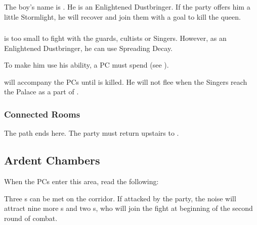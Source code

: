 
The boy's name is \npcCellarBoy{}. He is an Enlightened Dustbringer. If the party offers him a little Stormlight, he will recover and join them with a goal to kill the queen.

\subsubsection{\npcCellarBoyName{}}

\npcCellarBoy{} is too small to fight with the guards, cultists or Singers. However, as an Enlightened Dustbringer, he can use Spreading Decay.

To make him use his ability, a PC must spend \iconOpp{} (see ).

\npcCellarBoy{} will accompany the PCs until \npcQueen{} is killed. He will not flee when the Singers reach the Palace as a part of .

\subsubsection{Connected Rooms}

The path ends here. The party must return upstairs to .




\subsection{Ardent Chambers}
\label{ssec:kholinarPalaceRoomsArdentChambers}

When the PCs enter this area, read the following:


Three \enemyCultist{}s can be met on the corridor. If attacked by the party, the noise will attract nine more \enemyCultist{}s and two \enemyRevelerSadistic{}s, who will join the fight at beginning of the second round of combat. 

